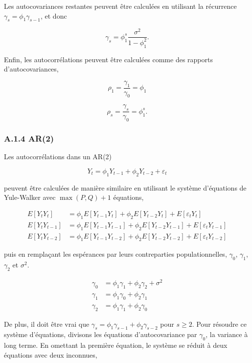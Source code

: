 \documentclass[
  letterpaper,
  DIV=11,
  numbers=noendperiod]{scrartcl}
\begin{document}
Les autocovariances restantes peuvent être calculées en utilisant la
récurrence \(\gamma_s = \phi_1 \gamma_{s-1}\), et donc

\[
\gamma_s = \phi_1^s \frac{\sigma^2}{1 - \phi_1^2}.
\]

Enfin, les autocorrélations peuvent être calculées comme des rapports
d'autocovariances,

\[
\rho_1 = \frac{\gamma_1}{\gamma_0} = \phi_1
\]

\[
\rho_s = \frac{\gamma_s}{\gamma_0} = \phi_1^s.
\]

\subsubsection{A.1.4 AR(2)}\label{a.1.4-ar2}

Les autocorrélations dans un AR(2)

\[
Y_t = \phi_1 Y_{t-1} + \phi_2 Y_{t-2} + \varepsilon_t
\]

peuvent être calculées de manière similaire en utilisant le système
d'équations de Yule-Walker avec \(\max(P, Q) + 1\) équations,

\[
\begin{aligned}
E[Y_t Y_t] &= \phi_1 E[Y_{t-1} Y_t] + \phi_2 E[Y_{t-2} Y_t] + E[\varepsilon_t Y_t] \\
E[Y_t Y_{t-1}] &= \phi_1 E[Y_{t-1} Y_{t-1}] + \phi_2 E[Y_{t-2} Y_{t-1}] + E[\varepsilon_t Y_{t-1}] \\
E[Y_t Y_{t-2}] &= \phi_1 E[Y_{t-1} Y_{t-2}] + \phi_2 E[Y_{t-2} Y_{t-2}] + E[\varepsilon_t Y_{t-2}]
\end{aligned}
\]

puis en remplaçant les espérances par leurs contreparties
populationnelles, \(\gamma_0\), \(\gamma_1\), \(\gamma_2\) et
\(\sigma^2\).

\[
\begin{aligned}
\gamma_0 &= \phi_1 \gamma_1 + \phi_2 \gamma_2 + \sigma^2 \\
\gamma_1 &= \phi_1 \gamma_0 + \phi_2 \gamma_1 \\
\gamma_2 &= \phi_1 \gamma_1 + \phi_2 \gamma_0
\end{aligned}
\]

De plus, il doit être vrai que
\(\gamma_s = \phi_1 \gamma_{s-1} + \phi_2 \gamma_{s-2}\) pour
\(s \geq 2\). Pour résoudre ce système d'équations, divisons les
équations d'autocovariance par \(\gamma_0\), la variance à long terme.
En omettant la première équation, le système se réduit à deux équations
avec deux inconnues,
\end{document}

